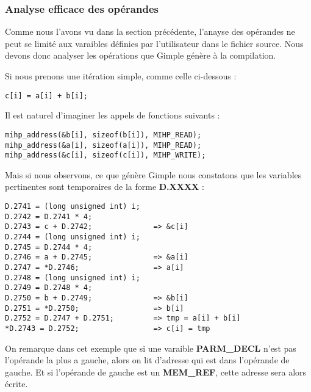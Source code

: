 \documentclass[12pt,french]{article}
\begin{document}
		\subsubsection{\color{blue}Analyse efficace des opérandes}

Comme nous l'avons vu dans la section précédente, l'anayse des opérandes ne peut se limité aux varaibles définies par l'utilisateur dans le fichier source. Nous devons donc analyser les opérations que Gimple génère à la compilation.

Si nous prenons une itération simple, comme celle ci-dessous :

\begin{center}
\color{blue}
\begin{lstlisting}
c[i] = a[i] + b[i];
\end{lstlisting}
\end{center}

Il est naturel d'imaginer les appels de fonctions suivants :

\begin{center}
\color{blue}
\begin{lstlisting}
mihp_address(&b[i], sizeof(b[i]), MIHP_READ);
mihp_address(&a[i], sizeof(a[i]), MIHP_READ);
mihp_address(&c[i], sizeof(c[i]), MIHP_WRITE);
\end{lstlisting}
\end{center}

Mais si nous observons, ce que génère Gimple nous constatons que les variables pertinentes sont temporaires de la forme \textbf{D.XXXX} :

\begin{center}
\color{blue}
\begin{lstlisting}
D.2741 = (long unsigned int) i;
D.2742 = D.2741 * 4;
D.2743 = c + D.2742;              => &c[i]
D.2744 = (long unsigned int) i;
D.2745 = D.2744 * 4;
D.2746 = a + D.2745;              => &a[i]
D.2747 = *D.2746;                 => a[i]
D.2748 = (long unsigned int) i;
D.2749 = D.2748 * 4;
D.2750 = b + D.2749;              => &b[i]
D.2751 = *D.2750;                 => b[i]
D.2752 = D.2747 + D.2751;         => tmp = a[i] + b[i]
*D.2743 = D.2752;                 => c[i] = tmp
\end{lstlisting}
\end{center}

On remarque dans cet exemple que si une varaible \textbf{PARM\_DECL} n'est pas l'opérande la plus a gauche, alors on lit d'adresse qui est dans l'opérande de gauche. Et si l'opérande de gauche est un \textbf{MEM\_REF}, cette adresse sera alors écrite.
\end{document}
